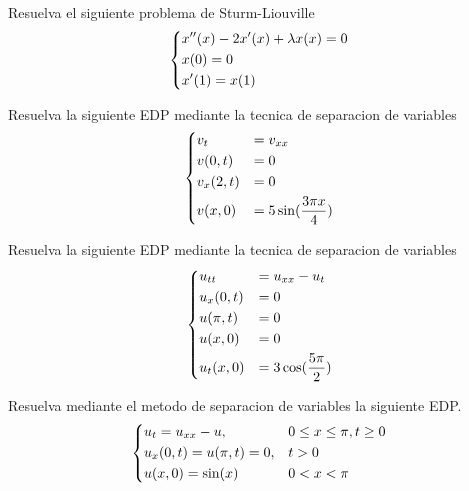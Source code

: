 \documentclass{article}
\begin{document}
\begin{problem}
  Resuelva el siguiente problema de Sturm-Liouville
  \begin{equation*}
    \begin{dcases}
      x''(x) - 2x'(x) + \lambda x(x) = 0\\
      x(0) = 0\\
      x'(1) = x(1)
    \end{dcases}
  \end{equation*}
\end{problem}

\begin{problem}
  Resuelva la siguiente EDP mediante la tecnica de separacion de variables
  \begin{equation*}
    \begin{dcases}
      v_{t} &= v_{xx}\\
      v(0, t) &= 0\\
      v_{x}(2, t) &= 0\\
      v(x, 0) &= 5 \sin(\frac{3\pi x}{4})
    \end{dcases}
  \end{equation*}
\end{problem}

\begin{problem}
  Resuelva la siguiente EDP mediante la tecnica de separacion de variables
  \begin{equation*}
  \begin{dcases}
    u_{tt} &= u_{xx} - u_t\\
    u_x(0, t) &= 0\\
    u(\pi, t) &= 0\\
    u(x, 0) &= 0\\
    u_t(x, 0) &= 3 \cos(\frac{5\pi}{2})
  \end{dcases}
  \end{equation*}
\end{problem}

\begin{problem}
  Resuelva mediante el metodo de separacion de variables la siguiente EDP.
  \begin{equation*}
  \begin{dcases}
    u_t = u_{xx} - u, & 0 \leq x \leq \pi, t \geq 0\\
    u_x(0, t) = u(\pi, t) = 0, & t > 0\\
    u(x, 0) = \sin(x) & 0 < x < \pi
  \end{dcases}
  \end{equation*}
\end{problem}
\end{document}
